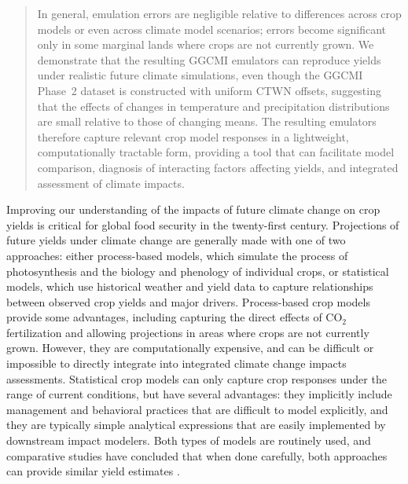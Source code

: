 \documentclass[gmdd]{copernicus} %
\begin{document}
\begin{abstract}
In general, emulation errors are negligible relative to differences across crop models or even across climate model scenarios; errors become significant only in some marginal lands where crops are not currently grown.  We demonstrate that the resulting GGCMI emulators can reproduce yields under realistic future climate simulations, even though the GGCMI Phase~2 dataset is constructed with uniform CTWN offsets, suggesting that the effects of changes in temperature and precipitation distributions are small relative to those of changing means. 
The resulting emulators therefore capture relevant crop model responses in a lightweight, computationally tractable form, providing a tool that can facilitate model comparison, diagnosis of interacting factors affecting yields, and integrated assessment of climate impacts.
\end{abstract}


\introduction
\label{S:1}
Improving our understanding of the impacts of future climate change on crop yields is critical for global food security in the twenty-first century. 
Projections of future yields under climate change are generally made with one of two approaches: either process-based models, which  simulate the process of photosynthesis and the biology and phenology of individual crops, or statistical models, which use historical weather and yield data to capture relationships between observed crop yields and major drivers.
Process-based crop models provide some advantages, including capturing the direct effects of CO$_2$ fertilization and allowing projections in areas where crops are not currently grown. 
However, they are computationally expensive, and can be difficult or impossible to directly integrate into integrated climate change impacts assessments.
Statistical crop models can only capture crop responses under the range of current conditions, but have several advantages: they implicitly include management and behavioral practices that are difficult to model explicitly, and they are typically simple analytical expressions that are easily implemented by downstream impact modelers. 
Both types of models are routinely used, and comparative studies have concluded that when done carefully, both approaches can provide similar yield estimates \citep[e.g.][]{Lobell2010, Moore2017, Roberts2017, zhao2017,liu2016similar}. 
\end{document}
